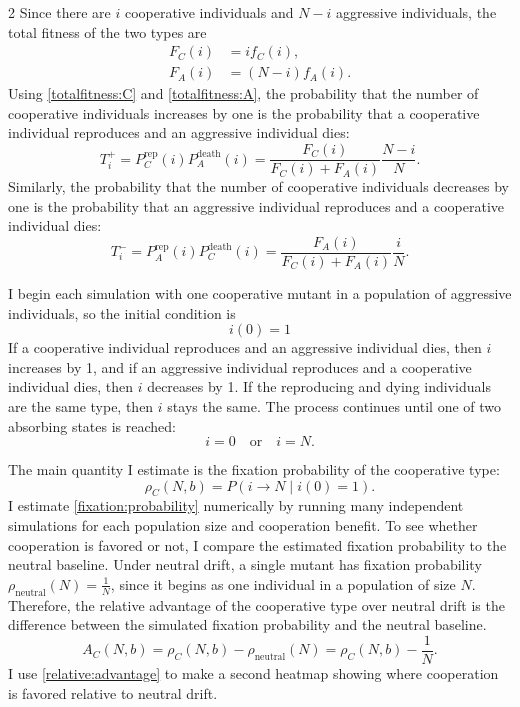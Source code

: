 \documentclass[11pt]{article}
\begin{document}
\begin{multicols}{2}
Since there are $i$ cooperative individuals and $N-i$ aggressive individuals, the total fitness of the two types are
\begin{align}
F_C(i) &= i f_C(i), \label{totalfitness:C}\\
F_A(i) &= (N-i) f_A(i). \label{totalfitness:A}
\end{align}
Using \eqref{totalfitness:C} and \eqref{totalfitness:A}, the probability that the number of cooperative individuals increases by one is the probability that a cooperative individual reproduces and an aggressive individual dies:
\begin{equation}\label{transition:plus}
T_i^+
=
P_C^{\mathrm{rep}}(i)P_A^{\mathrm{death}}(i)
=
\frac{F_C(i)}{F_C(i)+F_A(i)}
\frac{N-i}{N}.
\end{equation}
Similarly, the probability that the number of cooperative individuals decreases by one is the probability that an aggressive individual reproduces and a cooperative individual dies:
\begin{equation}\label{transition:minus}
T_i^-
=
P_A^{\mathrm{rep}}(i)P_C^{\mathrm{death}}(i)
=
\frac{F_A(i)}{F_C(i)+F_A(i)}
\frac{i}{N}.
\end{equation}

I begin each simulation with one cooperative mutant in a population of aggressive individuals, so the initial condition is
\[
i(0)=1
\]
If a cooperative individual reproduces and an aggressive individual dies, then $i$ increases by 1, and if an aggressive individual reproduces and a cooperative individual dies, then $i$ decreases by 1. If the reproducing and dying individuals are the same type, then $i$ stays the same. The process continues until one of two absorbing states is reached: 
\[
i=0 \quad \text{or} \quad i=N.
\]

The main quantity I estimate is the fixation probability of the cooperative type:
\begin{equation}\label{fixation:probability}
\rho_C(N, b)
=
P\left(i \rightarrow N \mid i(0)=1\right).
\end{equation}
I estimate \eqref{fixation:probability} numerically by running many independent simulations for each population size and cooperation benefit. To see whether cooperation is favored or not, I compare the estimated fixation probability to the neutral baseline. Under neutral drift, a single mutant has fixation probability $\rho_{\mathrm{neutral}}(N) = \frac{1}{N}$, since it begins as one individual in a population of size $N$. Therefore, the relative advantage of the cooperative type over neutral drift is the difference between the simulated fixation probability and the neutral baseline. 
\begin{equation}\label{relative:advantage}
A_C(N,b)
=
\rho_C(N,b)-\rho_{\mathrm{neutral}}(N)
=
\rho_C(N,b)-\frac{1}{N}.
\end{equation}
I use \eqref{relative:advantage} to make a second heatmap showing where cooperation is favored relative to neutral drift.


\end{multicols}
\end{document}
